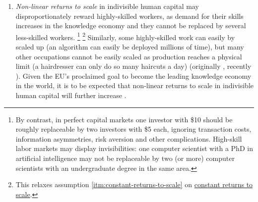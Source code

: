 \begin{enumerate}
	\item
		\label{itm:non-linear-returns}
	\emph{Non-linear returns to scale} in indivisible human capital may disproportionately reward highly-skilled workers, as demand for their skills increases in the knowledge economy and they cannot be replaced by several less-skilled workers.
	\footnote{
		By contrast, in perfect capital markets one investor with \$10 should be roughly replaceable by two investors with \$5 each, ignoring transaction costs, information asymmetries, risk aversion and other complications.
		High-skill labor markets may display invisibilities:
		one computer scientist with a PhD in artificial intelligence may not be replaceable by two (or more) computer scientists with an undergraduate degree in the same area.
	}
	\footnote{
		This relaxes  assumption \ref{itm:constant-returns-to-scale} on \hyperref[itm:constant-returns-to-scale]{constant returns to scale}.
	}
	Similarly, some highly-skilled work can easily by scaled up (an algorithm can  easily be deployed millions of time), but many other occupations cannot be easily scaled as production reaches a physical limit (a hairdresser can only do so many haircuts a day) (originally \citealt{Rosen1981}, recently \citealt{Taleb2007}).
	Given the \gls{EU}'s proclaimed goal to become the leading knowledge economy in the world, it is to be expected that non-linear returns to scale in indivisible human capital will further increase \citep{Commission2007}.


\end{enumerate}
